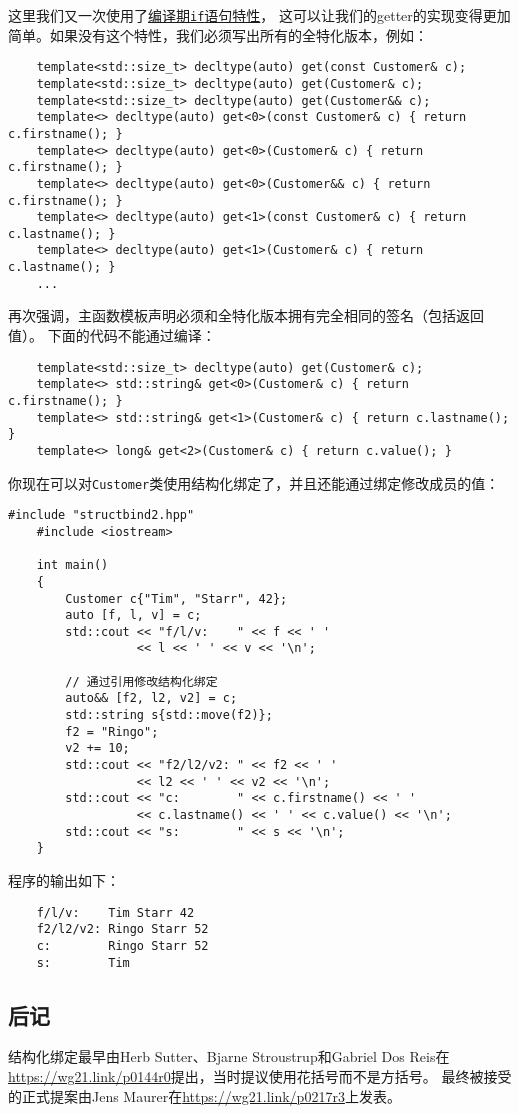 这里我们又一次使用了\hyperref[ch10]{编译期\texttt{if}语句特性}，
这可以让我们的getter的实现变得更加简单。如果没有这个特性，我们必须写出所有的全特化版本，例如：
\begin{lstlisting}
    template<std::size_t> decltype(auto) get(const Customer& c);
    template<std::size_t> decltype(auto) get(Customer& c);
    template<std::size_t> decltype(auto) get(Customer&& c);
    template<> decltype(auto) get<0>(const Customer& c) { return c.firstname(); }
    template<> decltype(auto) get<0>(Customer& c) { return c.firstname(); }
    template<> decltype(auto) get<0>(Customer&& c) { return c.firstname(); }
    template<> decltype(auto) get<1>(const Customer& c) { return c.lastname(); }
    template<> decltype(auto) get<1>(Customer& c) { return c.lastname(); }
    ...
\end{lstlisting}
再次强调，主函数模板声明必须和全特化版本拥有完全相同的签名（包括返回值）。
下面的代码不能通过编译：
\begin{lstlisting}
    template<std::size_t> decltype(auto) get(Customer& c);
    template<> std::string& get<0>(Customer& c) { return c.firstname(); }
    template<> std::string& get<1>(Customer& c) { return c.lastname(); }
    template<> long& get<2>(Customer& c) { return c.value(); }
\end{lstlisting}
你现在可以对\texttt{Customer}类使用结构化绑定了，并且还能通过绑定修改成员的值：
\begin{lstlisting}[frame=single, title=lang/structbind2.cpp]
    #include "structbind2.hpp"
    #include <iostream>

    int main()
    {
        Customer c{"Tim", "Starr", 42};
        auto [f, l, v] = c;
        std::cout << "f/l/v:    " << f << ' '
                  << l << ' ' << v << '\n';

        // 通过引用修改结构化绑定
        auto&& [f2, l2, v2] = c;
        std::string s{std::move(f2)};
        f2 = "Ringo";
        v2 += 10;
        std::cout << "f2/l2/v2: " << f2 << ' '
                  << l2 << ' ' << v2 << '\n';
        std::cout << "c:        " << c.firstname() << ' '
                  << c.lastname() << ' ' << c.value() << '\n';
        std::cout << "s:        " << s << '\n';
    }
\end{lstlisting}
程序的输出如下：
\begin{lstlisting}
    f/l/v:    Tim Starr 42
    f2/l2/v2: Ringo Starr 52
    c:        Ringo Starr 52
    s:        Tim
\end{lstlisting}

\subsection{后记}
结构化绑定最早由Herb Sutter、Bjarne Stroustrup和Gabriel Dos Reis在
\url{https://wg21.link/p0144r0}提出，当时提议使用花括号而不是方括号。
最终被接受的正式提案由Jens Maurer在\url{https://wg21.link/p0217r3}上发表。
